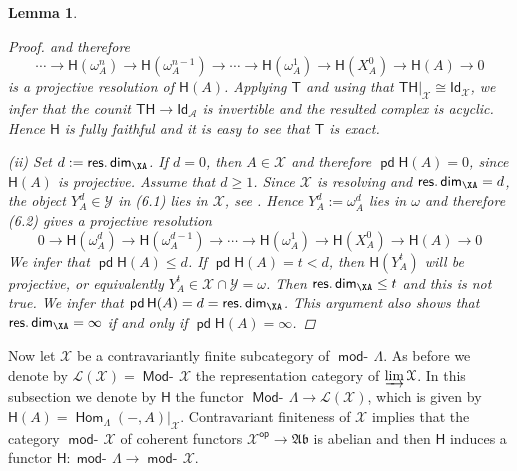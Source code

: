 \documentclass[oneside, a4paper,reqno]{amsart}
\numberwithin{equation}{section}
\newtheorem{lem}[thm]{Lemma}
\theoremstyle{definition}
\begin{document}
\begin{lem}
\begin{proof}
and therefore
\begin{equation}
 \cdots {\longrightarrow} \mathsf{H}(\omega^{n}_{A}) {\longrightarrow} \mathsf{H}(\omega^{n-1}_{A}) {\longrightarrow}
\cdots {\longrightarrow} \mathsf{H}(\omega^{1}_{A}) {\longrightarrow} \mathsf{H}(X^{0}_{A})
{\longrightarrow} \mathsf{H}(A) {\longrightarrow} 0
\end{equation}
is a projective resolution of $\mathsf{H}(A)$.  Applying
$\mathsf{T}$ and using that $\mathsf{T}\mathsf{H}|_{\mathcal X} \cong
\mathsf{Id}_{\mathcal X}$, we infer that the counit $\mathsf{T}\mathsf{H}
{\longrightarrow} \mathsf{Id}_{\mathscr A}$ is invertible and the resulted complex is
acyclic. Hence $\mathsf{H}$ is fully
faithful and it is easy to see that $\mathsf{T}$ is exact.

(ii) Set $d := \operatorname*{\mathsf{res.dim}}_\XA$. If $d = 0$, then $A\in {\mathcal X}$ and therefore
 $\operatorname{\mathsf{pd}}\mathsf{H}(A) = 0$, since $\mathsf{H}(A)$ is projective. Assume
 that $d \geq 1$. Since ${\mathcal X}$ is resolving and
 $\operatorname*{\mathsf{res.dim}}_\XA = d$, the object $Y^{d}_{A} \in
{\mathcal Y}$ in (6.1) lies in ${\mathcal X}$, see \cite[Lemma 3.12]{ABr}. Hence
$Y^{d}_{A} := \omega^{d}_{A}$ lies in $\omega$ and therefore (6.2)
gives a projective resolution
\[
0 {\longrightarrow} \mathsf{H}(\omega^{d}_{A}) {\longrightarrow} \mathsf{H}(\omega^{d-1}_{A})
{\longrightarrow} \cdots {\longrightarrow} \mathsf{H}(\omega^{1}_{A}) {\longrightarrow}
\mathsf{H}(X^{0}_{A}) {\longrightarrow} \mathsf{H}(A) {\longrightarrow} 0
\]
We infer that $\operatorname{\mathsf{pd}}\mathsf{H}(A) \leq d$. If $\operatorname{\mathsf{pd}}\mathsf{H}(A) = t <
d$, then $\mathsf{H}(Y^{t}_{A})$ will be projective, or equivalently
$Y^{t}_{A} \in {\mathcal X} \cap {\mathcal Y} = \omega$. Then $\operatorname*{\mathsf{res.dim}}_\XA \leq t$ and
this is not true. We infer that $\operatorname{\mathsf{pd}}\mathsf{H}(A) = d = \operatorname*{\mathsf{res.dim}}_\XA$.
This argument also shows that $\operatorname*{\mathsf{res.dim}}_\XA = \infty$ if and only if
$\operatorname{\mathsf{pd}}\mathsf{H}(A) = \infty$.
\end{proof}
 \end{lem}

Now let ${\mathcal X}$ be a contravariantly finite
 subcategory of $\operatorname*{\mathsf{mod}-\!}\Lambda$. As before we denote by $\mathcal L({\mathcal X}) = \operatorname*{\mathsf{Mod}-\!}{\mathcal X}$
 the representation category of $\operatorname*{\varinjlim}{\mathcal X}$. In this subsection we denote by
 $\mathsf{H}$  the functor  $\operatorname*{\mathsf{Mod}-\!}\Lambda {\longrightarrow} \mathcal L({\mathcal X})$,
  which is given
 by  $\mathsf{H}(A) = \operatorname{\mathsf{Hom}}_{\Lambda}(-,A)|_{\mathcal X}$.  Contravariant
 finiteness of ${\mathcal X}$  implies that the category $\operatorname*{\mathsf{mod}-\!}{\mathcal X}$ of coherent functors
 ${\mathcal X}^\operatorname*{\mathsf{op}} \to {\mathfrak{Ab}}$  is abelian and then $\mathsf{H}$ induces a functor
 $\mathsf{H}  \colon \operatorname*{\mathsf{mod}-\!}\Lambda {\longrightarrow} \operatorname*{\mathsf{mod}-\!}{\mathcal X}$.
\end{document}
